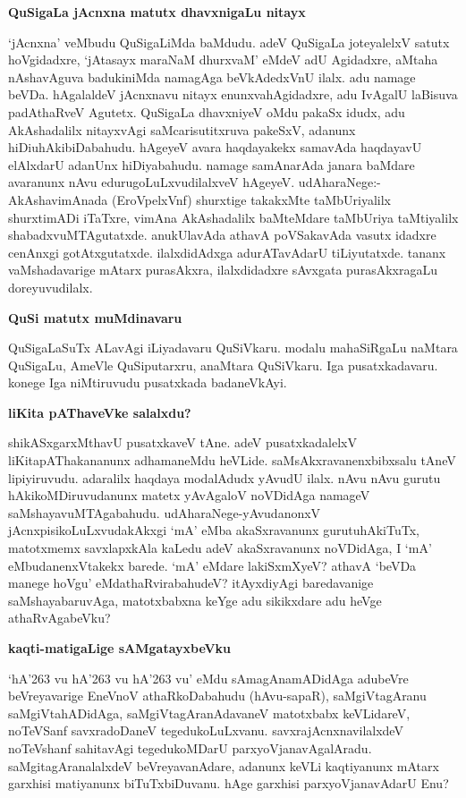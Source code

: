 \textbf{QuSigaLa jAcnxna matutx dhavxnigaLu nitayx}

`jAcnxna' veMbudu QuSigaLiMda baMdudu. adeV QuSigaLa joteyalelxV satutx 
hoVgidadxre, `jAtasayx maraNaM dhurxvaM' eMdeV adU Agidadxre, aMtaha nAshavAguva badukiniMda namagAga beVkAdedxVnU ilalx. adu namage beVDa. hAgalaldeV jAcnxnavu nitayx enunxvahAgidadxre, adu IvAgalU laBisuva padAthaRveV Agutetx. QuSigaLa dhavxniyeV oMdu pakaSx idudx, adu AkAshadalilx nitayxvAgi saMcarisutitxruva pakeSxV, adanunx hiDiuhAkibiDabahudu. hAgeyeV avara haqdayakekx samavAda haqdayavU elAlxdarU adanUnx
hiDiyabahudu. namage samAnarAda janara baMdare avaranunx nAvu edurugoLuLxvudilalxveV hAgeyeV. udAharaNege:-AkAshavimAnada (EroVpelxVnf) shurxtige takakxMte taMbUriyalilx shurxtimADi iTaTxre, vimAna AkAshadalilx baMteMdare taMbUriya taMtiyalilx shabadxvuMTAgutatxde. anukUlavAda athavA poVSakavAda vasutx idadxre cenAnxgi gotAtxgutatxde. ilalxdidAdxga adurATavAdarU tiLiyutatxde. tananx vaMshadavarige mAtarx purasAkxra, ilalxdidadxre sAvxgata purasAkxragaLu doreyuvudilalx.

\textbf{QuSi matutx muMdinavaru}

QuSigaLaSuTx ALavAgi iLiyadavaru QuSiVkaru. modalu mahaSiRgaLu naMtara QuSigaLu, AmeVle QuSiputarxru, anaMtara QuSiVkaru. Iga pusatxkadavaru. konege Iga niMtiruvudu pusatxkada badaneVkAyi.

\textbf{liKita pAThaveVke salalxdu?}

shikASxgarxMthavU pusatxkaveV tAne. adeV pusatxkadalelxV liKitapAThakananunx adhamaneMdu heVLide. saMsAkxravanenxbibxsalu tAneV lipiyiruvudu. adaralilx haqdaya modalAdudx yAvudU ilalx. nAvu nAvu gurutu hAkikoMDiruvudanunx matetx yAvAgaloV noVDidAga namageV saMshayavuMTAgabahudu. udAharaNege-yAvudanonxV jAcnxpisikoLuLxvudakAkxgi `mA' eMba akaSxravanunx gurutuhAkiTuTx, matotxmemx savxlapxkAla kaLedu adeV akaSxravanunx noVDidAga, I `mA' eMbudanenxVtakekx barede. `mA' eMdare lakiSxmXyeV? athavA `beVDa manege hoVgu'  eMdathaRvirabahudeV? itAyxdiyAgi baredavanige saMshayabaruvAga, matotxbabxna keYge adu sikikxdare adu heVge athaRvAgabeVku?

\textbf{kaqti-matigaLige sAMgatayxbeVku}

`hA\char'263 vu hA\char'263 vu hA\char'263 vu' eMdu sAmagAnamADidAga adubeVre beVreyavarige EneVnoV athaRkoDabahudu (hAvu-sapaR), saMgiVtagAranu saMgiVtahADidAga, saMgiVtagAranAdavaneV matotxbabx keVLidareV, noTeVSanf savxradoDaneV tegedukoLuLxvanu. savxrajAcnxnavilalxdeV noTeVshanf sahitavAgi tegedukoMDarU parxyoVjanavAgalAradu. saMgitagAranalalxdeV beVreyavanAdare, adanunx keVLi kaqtiyanunx mAtarx garxhisi matiyanunx biTuTxbiDuvanu. hAge garxhisi parxyoVjanavAdarU Enu?

